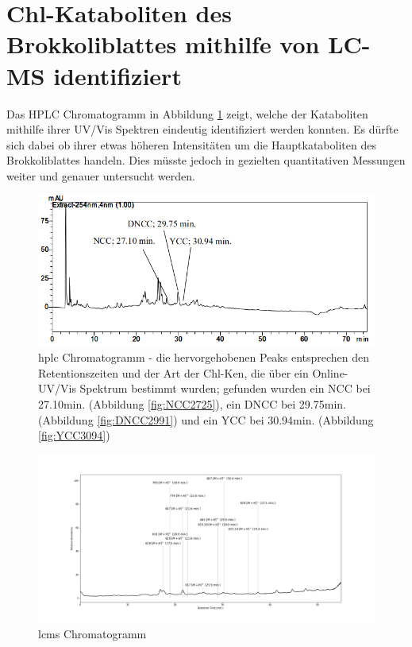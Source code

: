\section{Chl-Kataboliten des Brokkoliblattes mithilfe von LC-MS identifiziert} \label{sec:ChlKatabolitenBrokkoli}

Das HPLC Chromatogramm in Abbildung \ref{fig:HPLCChromatogramm} zeigt, welche der Kataboliten mithilfe ihrer UV/Vis Spektren eindeutig identifiziert werden konnten. Es dürfte sich dabei ob ihrer etwas höheren Intensitäten um die Hauptkataboliten des Brokkoliblattes handeln. Dies müsste jedoch in gezielten quantitativen Messungen weiter und genauer untersucht werden.

\begin{figure}[!htbp]
  \includegraphics[width=\textwidth]{figures/Kapitel6/keineReaktion/VWA_HPLC_Chromatogramm_keineReaktion.png}
  \caption[HPLC Chromatogramm vor der Reaktion, Quelle: Autor]{\gls{hplc} Chromatogramm - die hervorgehobenen Peaks entsprechen den Retentionszeiten und der Art der \gls{Chl-K}en, die über ein Online-UV/Vis Spektrum bestimmt wurden; gefunden wurden ein \gls{NCC} bei 27.10min. (Abbildung \ref{fig:NCC2725}), ein DNCC bei 29.75min. (Abbildung \ref{fig:DNCC2991}) und ein YCC bei 30.94min. (Abbildung \ref{fig:YCC3094})}
  \label{fig:HPLCChromatogramm}
\end{figure}

\begin{figure}[!htbp]
  \centering
  \includegraphics[width=1.4\textwidth, center]{figures/Kapitel6/keineReaktion/Kuerbis_Analyse_keineReaktion2_Ganzes_Spektrum.png}
  \caption[LC-MS Chromatogramm vor der Reaktion, Quelle: Autor]{\gls{lcms} Chromatogramm}
  \label{fig:LCMSChromatogramm}
\end{figure}

